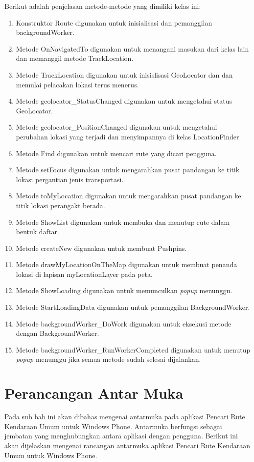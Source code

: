 Berikut adalah penjelasan metode-metode yang dimiliki kelas ini:
\begin{enumerate}
	\item Konstruktor Route digunakan untuk inisialisasi dan pemanggilan backgroundWorker.
	\item Metode OnNavigatedTo digunakan untuk menangani masukan dari kelas lain dan memanggil metode TrackLocation.
	\item Metode TrackLocation digunakan untuk inisislisasi GeoLocator dan dan memulai pelacakan lokasi terus menerus. 
	\item Metode geolocator\_StatusChanged digunakan untuk mengetahui status GeoLocator.
	\item Metode geolocator\_PositionChanged digunakan untuk mengetahui perubahan lokasi yang terjadi dan menyimpannya di kelas LocationFinder.
	\item Metode Find digunakan untuk mencari rute yang dicari pengguna.
	\item Metode setFocus digunakan untuk mengarahkan pusat pandangan ke titik lokasi pergantian jenis transportasi.
	\item Metode toMyLocation digunakan untuk mengarahkan pusat pandangan ke titik lokasi perangakt berada.
	\item Metode ShowList digunakan untuk membuka dan menutup rute dalam bentuk daftar.
	\item Metode createNew digunakan untuk membuat Pushpins.
	\item Metode drawMyLocationOnTheMap digunakan untuk membuat penanda lokasi di lapisan myLocationLayer pada peta.
	\item Metode ShowLoading digunakan untuk memunculkan \textit{popup} menunggu.
	\item Metode StartLoadingData digunakan untuk pemanggilan BackgroundWorker.
	\item Metode backgroundWorker\_DoWork digunakan untuk eksekusi metode dengan BackgroundWorker.
	\item Metode backgroundWorker\_RunWorkerCompleted digunakan untuk menutup \textit{popup} menunggu jika semua metode sudah selesai dijalankan.
\end{enumerate}

\section{Perancangan Antar Muka}
\label{lab:Perancangan Kelas}
\hspace{0.5cm} Pada sub bab ini akan dibahas mengenai antarmuka pada aplikasi Pencari Rute Kendaraan Umum untuk Windows Phone. Antarmuka berfungsi sebagai jembatan yang menghubungkan antara aplikasi dengan pengguna. Berikut ini akan dijelaskan mengenai rancangan antarmuka aplikasi Pencari Rute Kendaraan Umum untuk Windows Phone. 

